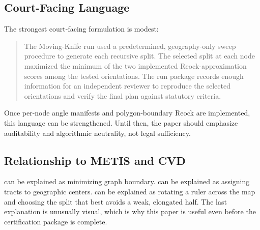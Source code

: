 \subsection{Court-Facing Language}

The strongest court-facing formulation is modest:

\begin{quote}
The Moving-Knife run used a predetermined, geography-only sweep procedure to
generate each recursive split. The selected split at each node maximized the
minimum of the two implemented Reock-approximation scores among the tested
orientations. The run package records enough information for an independent
reviewer to reproduce the selected orientations and verify the final plan
against statutory criteria.
\end{quote}

Once per-node angle manifests and polygon-boundary Reock are implemented, this
language can be strengthened. Until then, the paper should emphasize auditability
and algorithmic neutrality, not legal sufficiency.

\subsection{Relationship to METIS and CVD}

\metis{} can be explained as minimizing graph boundary. \cvdgeo{} can be
explained as assigning tracts to geographic centers. \mka{} can be explained as
rotating a ruler across the map and choosing the split that best avoids a weak,
elongated half. The last explanation is unusually visual, which is why this
paper is useful even before the certification package is complete.
